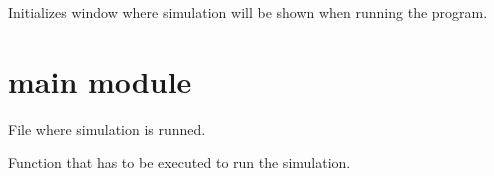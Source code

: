 \documentclass[a4paper,11pt,oneside,english]{sphinxmanual}
\begin{document}

\begin{fulllineitems}
\label{\detokenize{graphics:graphics.initialize_window}}
Initializes window where simulation will be shown when running the program.

\bigskip 
\bigskip 

\end{fulllineitems}



\chapter{main module}
\label{\detokenize{main:module-main}}\label{\detokenize{main:main-module}}\label{\detokenize{main::doc}}\label{\detokenize{main:module-0}}
File where simulation is runned.

\bigskip 
\bigskip 


\begin{fulllineitems}
\label{\detokenize{main:main.main}}
Function that has to be executed to run the simulation.

\bigskip 
\bigskip 

\end{fulllineitems}
\end{document}
